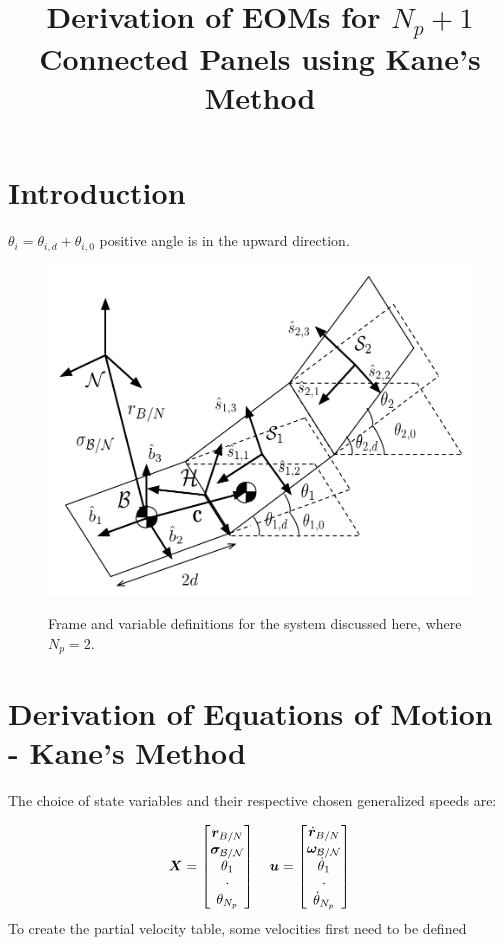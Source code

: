 \documentclass[paper]{aiaaNew}
\title{Derivation of EOMs for $N_p+1$ Connected Panels using Kane's Method}
\begin{document}
	
	
	\maketitle

\section{Introduction}
$\theta_i = \theta_{i,d} + \theta_{i,0}$ positive angle is in the upward direction.
\begin{figure}[H]
    \centering
    \includegraphics[scale=0.5]{Figures/conn_panels5.pdf}
    \label{fig:system}
    \caption{Frame and variable definitions for the system discussed here, where $N_p=2$.}
\end{figure}
\section{Derivation of Equations of Motion - Kane's Method}
	
The choice of state variables and their respective chosen generalized speeds are:
	
\begin{equation}
	\bm X = 
	\begin{bmatrix}
	\bm r_{B/N}\\
	\bm \sigma_{\cal{B/N}}\\
	\theta_1\\
	\cdot\\
	\theta_{N_p}
	\end{bmatrix}
	\quad
	\bm u = \begin{bmatrix}
	\dot{\bm r}_{B/N}\\
	\bm \omega_{\cal{B/N}}\\
	\dot{\theta}_1\\
	\cdot\\
	\dot{\theta}_{N_p}
	\end{bmatrix}
\end{equation} 	
To create the partial velocity table, some velocities first need to be defined
\end{document}
